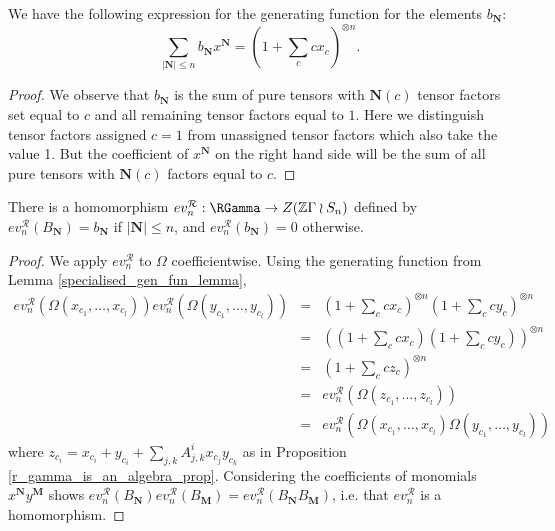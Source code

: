 \begin{lemma} \label{specialised_gen_fun_lemma}
We have the following expression for the generating function for the elements $b_{\mathbf{N}}$:
\[
\sum_{|\mathbf{N}| \leq n} b_{\mathbf{N}} x^{\mathbf{N}} = (1 + \sum_c c x_c)^{\otimes n}.
\]
\end{lemma}

\begin{proof}
We observe that $b_{\mathbf{N}}$ is the sum of pure tensors with $\mathbf{N}(c)$ tensor factors set equal to $c$ and all remaining tensor factors equal to $1$. Here we distinguish tensor factors assigned $c=1$ from unassigned tensor factors which also take the value 1. But the coefficient of $x^{\mathbf{N}}$ on the right hand side will be the sum of all pure tensors with $\mathbf{N}(c)$ factors equal to $c$. 
\end{proof}


\begin{theorem} \label{r_gamma_hom_thm}
There is a homomorphism $ev_n^{\mathcal{R}}: \RGamma \to Z(\mathbb{Z} \Gamma \wr S_n)$ defined by $ev_n^{\mathcal{R}}(B_{\mathbf{N}}) = b_{\mathbf{N}}$ if $|\mathbf{N}| \leq n$, and $ev_n^{\mathcal{R}}(b_{\mathbf{N}}) = 0$ otherwise.
\end{theorem}

\begin{proof}
We apply $ev_n^{\mathcal{R}}$ to $\Omega$ coefficientwise.
Using the generating function from Lemma \ref{specialised_gen_fun_lemma},
\begin{eqnarray*}
ev_n^{\mathcal{R}}(\Omega(x_{c_1}, \ldots, x_{c_l}))ev_n^{\mathcal{R}}( \Omega(y_{c_1}, \ldots, y_{c_l})) &=& 
(1 + \sum_c cx_c)^{\otimes n} (1 + \sum_c c y_c)^{\otimes n} \\
&=& ((1 + \sum_c cx_c)(1 + \sum_c c y_c))^{\otimes n} \\
&=& (1 + \sum_c c z_c)^{\otimes n} \\
&=& ev_n^{\mathcal{R}}(\Omega(z_{c_1}, \ldots, z_{c_l})) \\
&=& ev_n^{\mathcal{R}}(\Omega(x_{c_1}, \ldots, x_{c_l})\Omega(y_{c_1}, \ldots, y_{c_l}))
\end{eqnarray*}
where $z_{c_i} = x_{c_i} + y_{c_i} + \sum_{j,k}A_{j,k}^{i} x_{c_j} y_{c_k}$ as in Proposition \ref{r_gamma_is_an_algebra_prop}. Considering the coefficients of monomials $x^{\mathbf{N}}y^{\mathbf{M}}$ shows $ev_n^{\mathcal{R}}(B_{\mathbf{N}})ev_n^{\mathcal{R}}(B_{\mathbf{M}}) = ev_n^{\mathcal{R}}(B_{\mathbf{N}}B_{\mathbf{M}})$, i.e. that $ev_n^{\mathcal{R}}$ is a homomorphism.
\end{proof}


